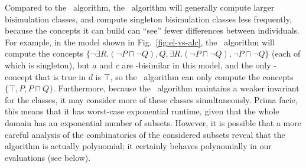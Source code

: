 Compared to the \alc\ algorithm, the \el\ algorithm will generally
compute larger bisimulation classes, and compute singleton
bisimulation classes less frequently, because the concepts it can
build can ``see'' fewer differences between individuals.  For example,
in the model shown in Fig.~\ref{fig:el-vs-alc}, the \alc\ algorithm
will compute the concepts $\{\neg \exists R. (\neg P \sqcap \neg Q),
Q, \exists R. (\neg P \sqcap \neg Q), \neg P \sqcap \neg Q\}$ (each of
which is singleton), but $a$ and $c$ are \el-bisimilar in this model,
and the only \el-concept that is true in $d$ is $\top$, so the \el\
algorithm can only compute the concepts $\{\top, P, P \sqcap Q\}$.
Furthermore, because the \el\ algorithm maintains a weaker invariant
for the classes, it may consider more of these classes simultaneously.
Prima facie, this means that it has worst-case exponential runtime,
given that the whole domain has an exponential number of subsets.
However, it is possible that a more careful analysis of the
combinatorics of the considered subsets reveal that the algorithm is
actually polynomial; it certainly behaves polynomially in our
evaluations (see below).


